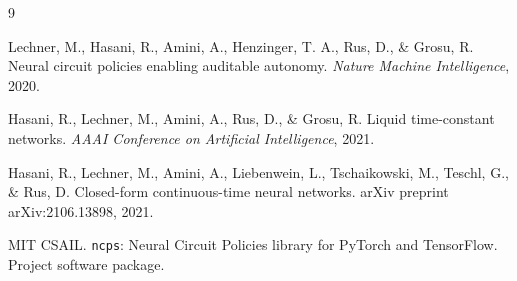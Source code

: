 \documentclass[11pt,a4paper]{article}
\begin{document}
\begin{thebibliography}{9}

Lechner, M., Hasani, R., Amini, A., Henzinger, T. A., Rus, D., \& Grosu, R. Neural circuit policies enabling auditable autonomy. \textit{Nature Machine Intelligence}, 2020.

Hasani, R., Lechner, M., Amini, A., Rus, D., \& Grosu, R. Liquid time-constant networks. \textit{AAAI Conference on Artificial Intelligence}, 2021.

Hasani, R., Lechner, M., Amini, A., Liebenwein, L., Tschaikowski, M., Teschl, G., \& Rus, D. Closed-form continuous-time neural networks. arXiv preprint arXiv:2106.13898, 2021.

MIT CSAIL. \texttt{ncps}: Neural Circuit Policies library for PyTorch and TensorFlow. Project software package.

\end{thebibliography}
\end{document}
